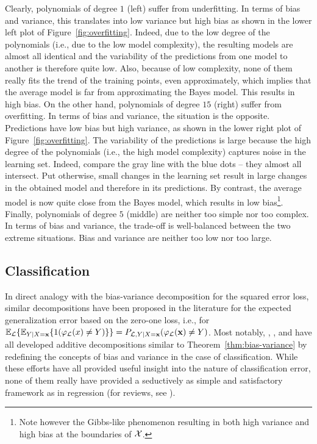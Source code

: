 Clearly, polynomials of degree $1$ (left) suffer from underfitting. In terms of
bias and variance, this translates into low variance but high bias as shown in
the lower left plot of Figure~\ref{fig:overfitting}. Indeed, due to the low
degree of the polynomials (i.e., due to the low model complexity), the
resulting models are almost all identical and  the variability of the
predictions from one model to another is therefore quite low. Also, because of
low complexity, none of them really fits the trend of the training points, even
approximately, which implies that the average model is far from approximating
the Bayes model. This results in high bias. On the other hand, polynomials of
degree $15$ (right) suffer from overfitting. In terms of bias and variance, the
situation is the opposite. Predictions have low bias but high variance, as
shown in the lower right plot of Figure~\ref{fig:overfitting}. The variability
of the predictions is large because the high degree of the polynomials (i.e.,
the high model complexity) captures noise in the learning set. Indeed, compare
the gray line with the blue dots -- they almost all intersect. Put otherwise,
small changes in the learning set result in large changes in the obtained model
and therefore in its predictions. By contrast, the average model is now quite
close from the Bayes model, which results in low bias\footnote{Note however the
Gibbs-like phenomenon resulting in both high variance and high bias at the
boundaries of ${\cal X}$.}. Finally, polynomials of degree $5$ (middle) are
neither too simple nor too complex. In terms of bias and variance, the trade-off
is well-balanced between the two extreme situations. Bias and variance are
neither too low nor too large.


\subsection{Classification}
\label{sec:bias-variance:classification}

In direct analogy with the bias-variance decomposition for the squared error
loss, similar decompositions have been proposed in the literature for the
expected generalization error based on the zero-one loss, i.e., for
$\mathbb{E}_{\cal L}\{ \mathbb{E}_{Y|X=\mathbf{x}} \{ 1(\varphi_{\cal L}(x)
\neq Y) \} \} = P_{{\cal L},Y|X=\mathbf{x}}(\varphi_{\cal L}(\mathbf{x}) \neq
Y)$. Most notably, \citet{dietterich:1995}, \citet{breiman:1996},
\citet{kohavi:1996} and \citet{tibshirani:1996} have all developed additive
decompositions similar to Theorem~\ref{thm:bias-variance} by redefining the
concepts of bias and variance in the case of classification. While these
efforts have all provided useful insight into the nature of classification
error, none of them really have provided a seductively as simple and
satisfactory framework as in regression (for reviews, see
\citep{friedman:1997,geurts:2002,james:2003}).

